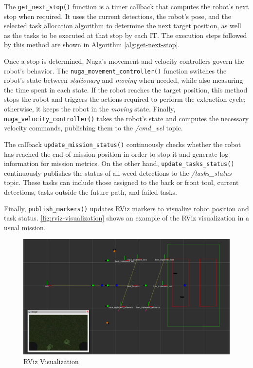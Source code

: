 The \texttt{get\_next\_stop()} function is a timer callback that computes the robot's next stop when required. It uses the current detections, the robot's pose, and the selected task allocation algorithm to determine the next target position, as well as the tasks to be executed at that stop by each \ac{IT}. The execution steps followed by this method are shown in Algorithm \ref{alg:get-next-stop}.

Once a stop is determined, Nuga’s movement and velocity controllers govern the robot’s behavior. The \texttt{nuga\_movement\_controller()} function switches the robot’s state between \textit{stationary} and \textit{moving} when needed, while also measuring the time spent in each state. If the robot reaches the target position, this method stops the robot and triggers the actions required to perform the extraction cycle; otherwise, it keeps the robot in the \textit{moving} state. Finally, \texttt{nuga\_velocity\_controller()} takes the robot’s state and computes the necessary velocity commands, publishing them to the \textit{/cmd\_vel} topic.

The callback \texttt{update\_mission\_status()} continuously checks whether the robot has reached the end-of-mission position in order to stop it and generate log information for mission metrics. On the other hand, \texttt{update\_tasks\_status()} continuously publishes the status of all weed detections to the \textit{/tasks\_status} topic. These tasks can include those assigned to the back or front tool, current detections, tasks outside the future path, and failed tasks.

Finally, \texttt{publish\_markers()} updates RViz markers to visualize robot position and task status. \autoref{fig:rviz-visualization} shows an example of the RViz visualization in a usual mission.

\begin{figure}[H]
    \centering
    \includegraphics[width=0.95\linewidth]{gfx/ch02/rviz_black_1.png}
    \caption{RViz Visualization}
    \label{fig:rviz-visualization}
\end{figure}

